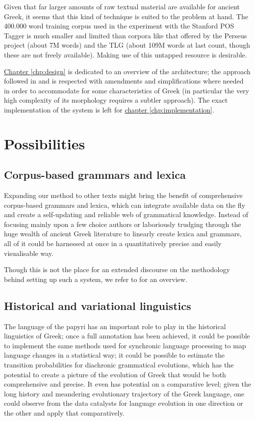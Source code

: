 Given that far larger amounts of raw textual material are available
for ancient Greek, it seems that this kind of technique is suited to
the problem at hand. The 400.000 word training corpus used in the
experiment with the Stanford POS Tagger is much smaller and limited
than corpora like that offered by the Perseus project (about 7M words)
and the TLG (about 109M words at last count, though these are not
freely available). Making use of this untapped resource is
desirable. 

\hyperref[chp:design]{Chapter \ref*{chp:design}} is dedicated to an
overview of the architecture; the approach followed in
\citet{collobert-2011} and \citet{turian2010word} is respected with
amendments and simplifications where needed in order to accommodate
for some characteristics of Greek (in particular the very high
complexity of its morphology requires a subtler approach). The exact
implementation of the system is left for
\hyperref[chp:implementation]{chapter \ref*{chp:implementation}}.

\section{Possibilities}

\subsection{Corpus-based grammars and lexica}
\label{sec:corpusbasedgrammars}
Expanding our method to other texts might bring the benefit of
comprehensive corpus-based grammars and lexica, which can integrate
available data on the fly and create a self-updating and reliable web
of grammatical knowledge. Instead of focusing mainly upon a few choice
authors or laboriously trudging through the huge wealth of ancient
Greek literature to linearly create lexica and grammars, all of it
could be harnessed at once in a quantitatively precise and easily
visualisable way.

Though this is not the place for an extended discourse on the
methodology behind setting up such a system, we refer to
\cite{bamman2008building,bammandhq2009} for an overview.

\subsection{Historical and variational linguistics} %
\label{sec:histlinguistics}
The language of the papyri has an important role to play in the
historical linguistics of Greek; once a full annotation has been
achieved, it could be possible to implement the same methods used for
synchronic language processing to map language changes in a
statistical way; it could be possible to estimate the transition
probabilities for diachronic grammatical evolutions, which has the
potential to create a picture of the evolution of Greek that would be
both comprehensive and precise. It even has potential on a comparative
level; given the long history and meandering evolutionary trajectory
of the Greek language, one could observe from the data catalysts for
language evolution in one direction or the other and apply that
comparatively.

